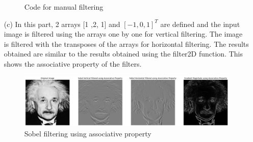 \documentclass[11pt]{article}
\begin{document}
\begin{flushleft}
\begin{itemize}
\begin{figure}[htp]
        \caption{Code for manual filtering}
    \end{figure}
    \item[(c)] In this part, 2 arrays [1 ,2, 1] and $[-1, 0, 1]^{T}$ are defined and the input image is filtered using the arrays one by one for vertical filtering. The image is filtered with the transposes of the arrays for horizontal filtering. The results obtained are similar to the results obtained using the filter2D function. This shows the associative property of the filters.
    \begin{figure}[htp]
        \centering
        \includegraphics[width=1.\textwidth]{AssociativeProperty.png}
        \caption{Sobel filtering using associative  property}
    \end{figure}

\end{itemize}
\end{flushleft}
\end{document}
